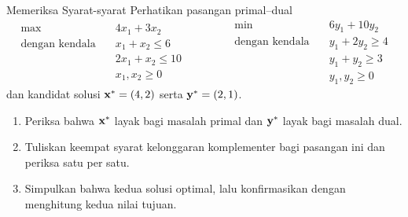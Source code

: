 \begin{ex}{Memeriksa Syarat-syarat}{}
\label{ex:cs-warmup-check}
 Perhatikan pasangan primal--dual
\[
\begin{aligned}
\max \quad & 4x_1 + 3x_2 \\
\text{dengan kendala} \quad & x_1 + x_2 \leq 6 \\
& 2x_1 + x_2 \leq 10 \\
& x_1, x_2 \geq 0
\end{aligned}
\qquad\qquad
\begin{aligned}
\min \quad & 6y_1 + 10y_2 \\
\text{dengan kendala} \quad & y_1 + 2y_2 \geq 4 \\
& y_1 + y_2 \geq 3 \\
& y_1, y_2 \geq 0
\end{aligned}
\]
dan kandidat solusi $\mathbf{x}^* = (4, 2)$ serta $\mathbf{y}^* = (2, 1)$.
\begin{enumerate}
\item Periksa bahwa $\mathbf{x}^*$ layak bagi masalah primal dan $\mathbf{y}^*$ layak bagi masalah dual.
\item Tuliskan keempat syarat kelonggaran komplementer bagi pasangan ini dan periksa satu per satu.
\item Simpulkan bahwa kedua solusi optimal, lalu konfirmasikan dengan menghitung kedua nilai tujuan.
\end{enumerate}
\end{ex}


